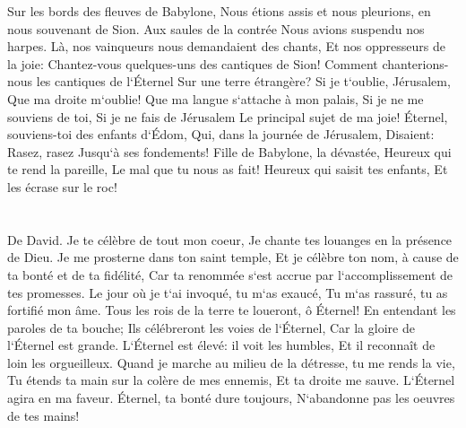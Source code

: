 \verse Sur les bords des fleuves de Babylone, Nous étions assis et nous pleurions, en nous souvenant de Sion. 
\verse Aux saules de la contrée Nous avions suspendu nos harpes. 
\verse Là, nos vainqueurs nous demandaient des chants, Et nos oppresseurs de la joie: Chantez-vous quelques-uns des cantiques de Sion! 
\verse Comment chanterions-nous les cantiques de l`Éternel Sur une terre étrangère? 
\verse Si je t`oublie, Jérusalem, Que ma droite m`oublie! 
\verse Que ma langue s`attache à mon palais, Si je ne me souviens de toi, Si je ne fais de Jérusalem Le principal sujet de ma joie! 
\verse Éternel, souviens-toi des enfants d`Édom, Qui, dans la journée de Jérusalem, Disaient: Rasez, rasez Jusqu`à ses fondements! 
\verse Fille de Babylone, la dévastée, Heureux qui te rend la pareille, Le mal que tu nous as fait! 
\verse Heureux qui saisit tes enfants, Et les écrase sur le roc! 

\chapter{}

\verse De David. Je te célèbre de tout mon coeur, Je chante tes louanges en la présence de Dieu. 
\verse Je me prosterne dans ton saint temple, Et je célèbre ton nom, à cause de ta bonté et de ta fidélité, Car ta renommée s`est accrue par l`accomplissement de tes promesses. 
\verse Le jour où je t`ai invoqué, tu m`as exaucé, Tu m`as rassuré, tu as fortifié mon âme. 
\verse Tous les rois de la terre te loueront, ô Éternel! En entendant les paroles de ta bouche; 
\verse Ils célébreront les voies de l`Éternel, Car la gloire de l`Éternel est grande. 
\verse L`Éternel est élevé: il voit les humbles, Et il reconnaît de loin les orgueilleux. 
\verse Quand je marche au milieu de la détresse, tu me rends la vie, Tu étends ta main sur la colère de mes ennemis, Et ta droite me sauve. 
\verse L`Éternel agira en ma faveur. Éternel, ta bonté dure toujours, N`abandonne pas les oeuvres de tes mains! 

\chapter{}

